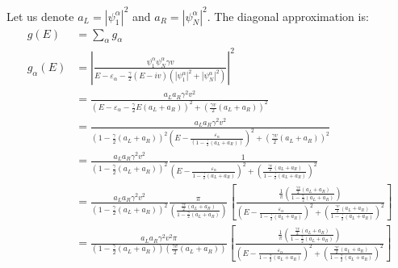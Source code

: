 \documentclass[11pt]{article}
\begin{document}
Let us denote ${a_L = |\psi_1^{\alpha}|^2 }$ and ${a_R = |\psi_N^{\alpha}|^2 }$.
The diagonal approximation is:
\begin{align*} 
g(E)&= \sum_\alpha g_\alpha \\
g_\alpha(E) &= \left|\frac{\psi_1^\alpha\psi_N^\alpha\gamma v}{E-\varepsilon_\alpha - \frac{\gamma}{2}(E-iv)\left(|\psi_1^\alpha|^2+|\psi_N^\alpha|^2\right)}\right|^2\\
&= \frac{a_La_R\gamma^2 v^2}{\left(E-\varepsilon_\alpha - \frac{\gamma}{2}E(a_L+a_R)\right)^2 + \left(\frac{\gamma v}{2}(a_L+a_R)\right)^2}\\
&= \frac{a_La_R\gamma^2 v^2}{\left(1-\frac{\gamma}{2}(a_L+a_R)\right)^2\left(E-\frac{\varepsilon_\alpha}{\left(1-\frac{\gamma}{2}(a_L+a_R)\right)}\right)^2 + \left(\frac{\gamma v}{2}(a_L+a_R)\right)^2}\\
&= \frac{a_La_R\gamma^2 v^2}{\left(1-\frac{\gamma}{2}(a_L+a_R)\right)^2}\frac{1}{\left(E-\frac{\varepsilon_\alpha}{1-\frac{\gamma}{2}(a_L+a_R)}\right)^2 + \left(\frac{\frac{\gamma v}{2}(a_L+a_R)}{1-\frac{\gamma}{2}(a_L+a_R)}\right)^2}\\
&= \frac{a_La_R\gamma^2 v^2}{\left(1-\frac{\gamma}{2}(a_L+a_R)\right)^2}\frac{\pi}{\left(\frac{\frac{\gamma v}{2}(a_L+a_R)}{1-\frac{\gamma}{2}(a_L+a_R)}\right)}\left[\frac{\frac{1}{\pi}\left(\frac{\frac{\gamma v}{2}(a_L+a_R)}{1-\frac{\gamma}{2}(a_L+a_R)}\right)}{\left(E-\frac{\varepsilon_\alpha}{1-\frac{\gamma}{2}(a_L+a_R)}\right)^2 + \left(\frac{\frac{\gamma v}{2}(a_L+a_R)}{1-\frac{\gamma}{2}(a_L+a_R)}\right)^2}\right]\\
&= \frac{a_La_R\gamma^2 v^2\pi}{\left(1-\frac{\gamma}{2}(a_L+a_R)\right)\left(\frac{\gamma v}{2}(a_L+a_R)\right)}
\left[\frac{\frac{1}{\pi}\left(\frac{\frac{\gamma v}{2}(a_L+a_R)}{1-\frac{\gamma}{2}(a_L+a_R)}\right)}{\left(E-\frac{\varepsilon_\alpha}{1-\frac{\gamma}{2}(a_L+a_R)}\right)^2 + \left(\frac{\frac{\gamma v}{2}(a_L+a_R)}{1-\frac{\gamma}{2}(a_L+a_R)}\right)^2}\right]\\
\end{align*}
\end{document}
